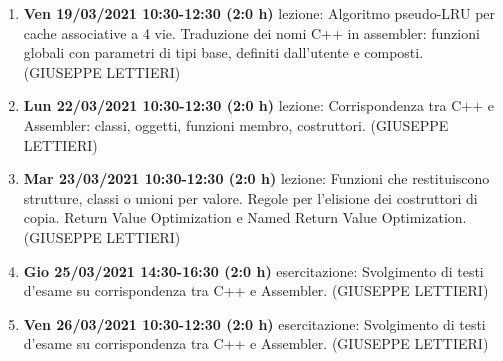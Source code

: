 \begin{enumerate}
	\item \textbf{Ven 19/03/2021 10:30-12:30 (2:0 h)} lezione: Algoritmo pseudo-LRU per cache associative a 4 vie. Traduzione dei nomi C++ in assembler: funzioni globali con parametri di tipi base, definiti dall'utente e composti. (GIUSEPPE LETTIERI)
	\item \textbf{Lun 22/03/2021 10:30-12:30 (2:0 h)} lezione: Corrispondenza tra C++ e Assembler: classi, oggetti, funzioni membro, costruttori. (GIUSEPPE LETTIERI)
	\item \textbf{Mar 23/03/2021 10:30-12:30 (2:0 h)} lezione: Funzioni che restituiscono strutture, classi o unioni per valore. Regole per l'elisione dei costruttori di copia. Return Value Optimization e Named Return Value Optimization. (GIUSEPPE LETTIERI)
	\item \textbf{Gio 25/03/2021 14:30-16:30 (2:0 h)} esercitazione: Svolgimento di testi d'esame su corrispondenza tra C++ e Assembler. (GIUSEPPE LETTIERI)
	\item \textbf{Ven 26/03/2021 10:30-12:30 (2:0 h)} esercitazione: Svolgimento di testi d'esame su corrispondenza tra C++ e Assembler. (GIUSEPPE LETTIERI)
\end{enumerate}
